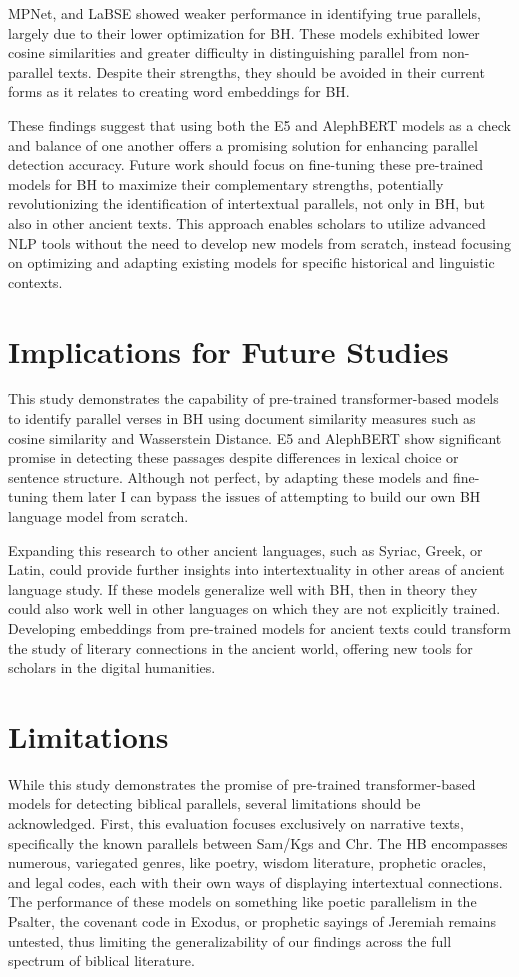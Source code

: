 \documentclass[12pt]{article}
\begin{document}
MPNet, and LaBSE showed weaker performance in identifying true parallels, largely due to their lower optimization for BH. These models exhibited lower cosine similarities and greater difficulty in distinguishing parallel from non-parallel texts. Despite their strengths, they should be avoided in their current forms as it relates to creating word embeddings for BH.

These findings suggest that using both the E5 and AlephBERT models as a check and balance of one another offers a promising solution for enhancing parallel detection accuracy. Future work should focus on fine-tuning these pre-trained models for BH to maximize their complementary strengths, potentially revolutionizing the identification of intertextual parallels, not only in BH, but also in other ancient texts. This approach enables scholars to utilize advanced NLP tools without the need to develop new models from scratch, instead focusing on optimizing and adapting existing models for specific historical and linguistic contexts.

\section{Implications for Future Studies}
This study demonstrates the capability of pre-trained transformer-based models to identify parallel verses in BH using document similarity measures such as cosine similarity and Wasserstein Distance. E5 and AlephBERT show significant promise in detecting these passages despite differences in lexical choice or sentence structure. Although not perfect, by adapting these models and fine-tuning them later I can bypass the issues of attempting to build our own BH language model from scratch.

Expanding this research to other ancient languages, such as Syriac, Greek, or Latin, could provide further insights into intertextuality in other areas of ancient language study. If these models generalize well with BH, then in theory they could also work well in other languages on which they are not explicitly trained.  Developing embeddings from pre-trained models for ancient texts could transform the study of literary connections in the ancient world, offering new tools for scholars in the digital humanities.

\section{Limitations}
While this study demonstrates the promise of pre-trained transformer-based models for detecting biblical parallels, several limitations should be acknowledged. First, this evaluation focuses exclusively on narrative texts, specifically the known parallels between Sam/Kgs and Chr. The HB encompasses numerous, variegated genres, like poetry, wisdom literature, prophetic oracles, and legal codes, each with their own ways of displaying intertextual connections. The performance of these models on something like poetic parallelism in the Psalter, the covenant code in Exodus, or prophetic sayings of Jeremiah remains untested, thus limiting the generalizability of our findings across the full spectrum of biblical literature.
\end{document}
